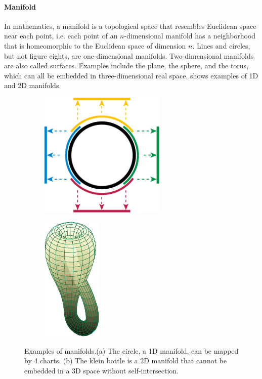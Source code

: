 \paragraph{Manifold}
In mathematics, a manifold is a topological space that resembles Euclidean space near each point, i.e. each point of an $n$-dimensional manifold has a neighborhood that is homeomorphic to the Euclidean space of dimension $n$. Lines and circles, but not figure eights, are one-dimensional manifolds. Two-dimensional manifolds are also called surfaces. Examples include the plane, the sphere, and the torus, which can all be embedded in three-dimensional real space.  shows examples of 1D and 2D manifolds.

\begin{figure}[ht]
	\centering
	\begin{subfigure}[b]{0.49\textwidth}
		\centering
		\includegraphics[height=6cm]{img/circle_manifold_charts}
		\caption{}
	\end{subfigure}
	\begin{subfigure}[b]{0.49\textwidth}
		\centering
		\includegraphics[height=6cm]{img/klein_bottle}
		\caption{}
	\end{subfigure}
	\caption[]{Examples of manifolds.\footnotemark (a) The circle, a 1D manifold, can be mapped by 4 charts. (b) The klein bottle is a 2D manifold that cannot be embedded in a 3D space without self-intersection.}
	\label{fig:manifolds}
\end{figure}

